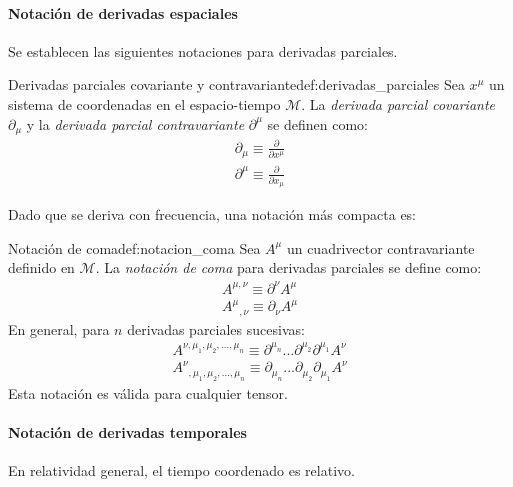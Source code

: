         \paragraph{Notación de derivadas espaciales}

            Se establecen las siguientes notaciones para derivadas parciales.

            \begin{definicion}{Derivadas parciales covariante y contravariante}{def:derivadas_parciales}
                Sea $x^\mu$ un sistema de coordenadas en el espacio-tiempo $\mathcal{M}$. La \textit{derivada parcial covariante} $\partial_\mu$ y la \textit{derivada parcial contravariante} $\partial^\mu$ se definen como:
                \begin{align}
                    \partial_\mu \equiv \frac{\partial}{\partial x^\mu} \label{eq:derivada_parcial_covariante} \\
                    \partial^\mu \equiv \frac{\partial}{\partial x_\mu} \label{eq:derivada_parcial_contravariante}
                \end{align}
            \end{definicion}

            Dado que se deriva con frecuencia, una notación más compacta es:

            \begin{definicion}{Notación de coma}{def:notacion_coma}
                Sea $A^\mu$ un cuadrivector contravariante definido en $\mathcal{M}$. La \textit{notación de coma} para derivadas parciales se define como:
                \begin{align}
                    A^{\mu, \nu} \equiv \partial^\nu A^\mu \label{eq:notacion_coma_contravariante} \\
                    {A^{\mu}}_{,\nu} \equiv \partial_\nu A^\mu \label{eq:notacion_coma_covariante}
                \end{align}
                En general, para $n$ derivadas parciales sucesivas:
                \begin{align}
                    A^{\nu, \mu_1, \mu_2, ..., \mu_n} \equiv \partial^{\mu_n} ... \partial^{\mu_2} \partial^{\mu_1} A^\nu \label{eq:notacion_coma_contravariante_n} \\
                    {A^{\nu}}_{,\mu_1, \mu_2, ..., \mu_n} \equiv \partial_{\mu_n} ... \partial_{\mu_2} \partial_{\mu_1} A^\nu \label{eq:notacion_coma_covariante_n}
                \end{align}
                Esta notación es válida para cualquier tensor.
            \end{definicion}

        \paragraph{Notación de derivadas temporales}

            En relatividad general, el tiempo coordenado es relativo.

